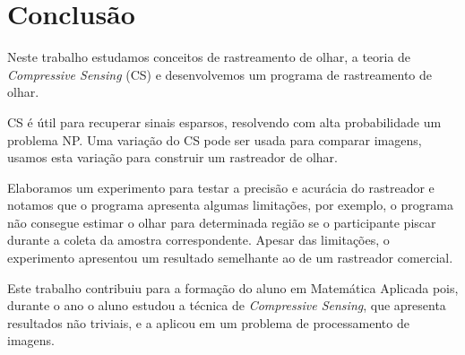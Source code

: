 \chapter{Conclusão}

Neste trabalho estudamos conceitos de rastreamento de olhar, a teoria de \textit{Compressive Sensing} (CS) e desenvolvemos um programa de rastreamento de olhar.


CS é útil para recuperar sinais esparsos, resolvendo com alta probabilidade um problema NP. Uma variação do CS pode ser usada para comparar imagens, usamos esta variação para construir um rastreador de olhar.

Elaboramos um experimento para testar a precisão e acurácia do rastreador e notamos que o programa apresenta algumas limitações, por exemplo, o programa não consegue estimar o olhar para determinada região se o participante piscar durante a coleta da amostra correspondente. Apesar das limitações, o experimento apresentou um resultado semelhante ao de um rastreador comercial.

Este trabalho contribuiu para a formação do aluno em Matemática Aplicada pois, durante o ano o aluno estudou a técnica de \textit{Compressive Sensing}, que apresenta resultados não triviais, e a aplicou em um problema de processamento de imagens.
